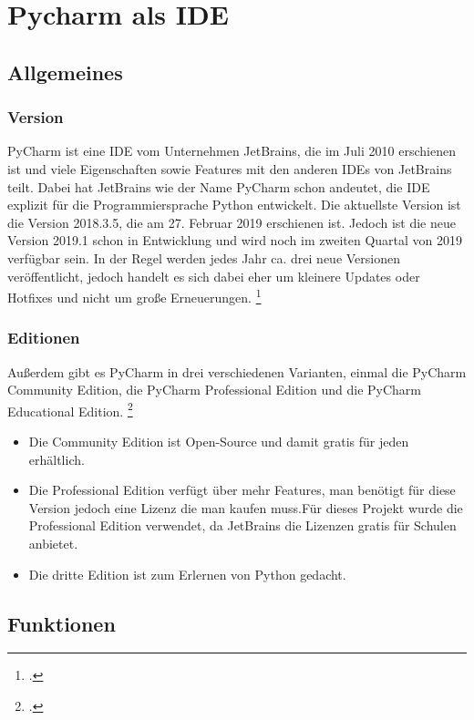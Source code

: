 \section{Pycharm als IDE}
\fib{}
\subsection{Allgemeines}

\subsubsection{Version}

\noindent
PyCharm ist eine IDE vom Unternehmen JetBrains, die im Juli 2010 erschienen ist und viele Eigenschaften sowie Features mit den anderen IDEs von JetBrains teilt. Dabei hat JetBrains wie der Name PyCharm schon andeutet, die IDE explizit für die Programmiersprache Python entwickelt. Die aktuellste Version ist die Version 2018.3.5, die am 27. Februar 2019 erschienen ist. Jedoch ist die neue Version 2019.1 schon in Entwicklung und wird noch im zweiten Quartal von 2019 verfügbar sein. 
In der Regel werden jedes Jahr ca. drei neue Versionen veröffentlicht, jedoch handelt es sich dabei eher um kleinere Updates oder Hotfixes und nicht um große Erneuerungen.
\footcite{noauthor_pycharm:_nodate}

\subsubsection{Editionen}

\noindent
Außerdem gibt es PyCharm in drei verschiedenen Varianten, einmal die PyCharm Community Edition, die PyCharm Professional Edition und die PyCharm Educational Edition.
\footcite{noauthor_previous_nodate}

\noindent
\begin{itemize}
    \item Die Community Edition ist Open-Source und damit gratis für jeden erhältlich. 
    \item Die Professional Edition verfügt über mehr Features, man benötigt für diese Version jedoch eine Lizenz die man kaufen muss.Für dieses Projekt wurde die Professional Edition verwendet, da JetBrains die Lizenzen gratis für Schulen anbietet.
    \item Die dritte Edition ist zum Erlernen von Python gedacht.
\end{itemize}



\subsection{Funktionen}
